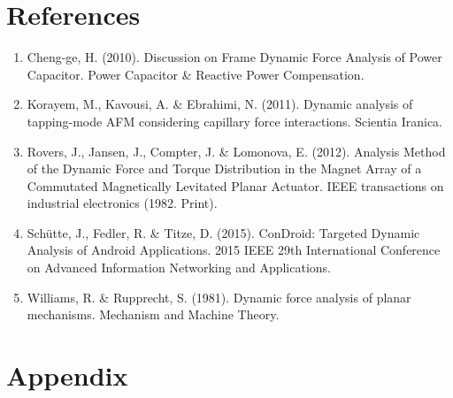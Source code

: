 \documentclass[12pt, titlepage]{article}
\begin{document}
\section{References}
\begin{enumerate}
    \item \label{item:cheng2010} Cheng-ge, H. (2010). Discussion on Frame
      Dynamic Force Analysis of Power Capacitor. Power Capacitor \& Reactive
      Power Compensation.

    \item \label{item:korayem2011} Korayem, M., Kavousi, A. \& Ebrahimi, N.
    (2011). Dynamic analysis of tapping-mode AFM considering capillary force
    interactions. Scientia Iranica.

    \item \label{item:rovers2012} Rovers, J., Jansen, J., Compter, J. \&
    Lomonova, E. (2012). Analysis Method of the Dynamic Force and Torque
    Distribution in the Magnet Array of a Commutated Magnetically Levitated
    Planar Actuator. IEEE transactions on industrial electronics (1982. Print).

    \item \label{item:shutte2015} Schütte, J., Fedler, R. \& Titze, D. (2015).
    ConDroid: Targeted Dynamic Analysis of Android Applications. 2015 IEEE 29th
    International Conference on Advanced Information Networking and
    Applications.

    \item \label{item:williams1981} Williams, R. \& Rupprecht, S. (1981). Dynamic
    force analysis of planar mechanisms. Mechanism and Machine Theory.
\end{enumerate}
\newpage
\section{Appendix}
\end{document}
